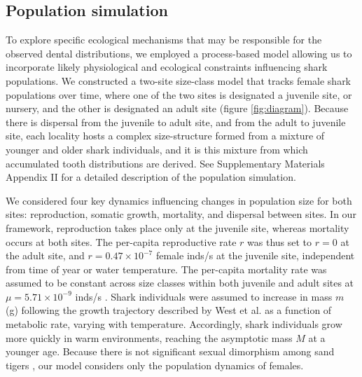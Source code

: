 \documentclass[]{rsos}%
\begin{document}
\subsection{Population simulation}

To explore specific ecological mechanisms that may be responsible for the observed dental distributions, we employed a process-based model allowing us to incorporate likely physiological and ecological constraints influencing shark populations.
We constructed a two-site size-class model that tracks female shark populations over time, where one of the two sites is designated a juvenile site, or nursery, and the other is designated an adult site (figure \ref{fig:diagram}).
Because there is dispersal from the juvenile to adult site, and from the adult to juvenile site, each locality hosts a complex size-structure formed from a mixture of younger and older shark individuals, and it is this mixture from which accumulated tooth distributions are derived.
See Supplementary Materials Appendix II for a detailed description of the population simulation.

We considered four key dynamics influencing changes in population size for both sites: reproduction, somatic growth, mortality, and dispersal between sites.
In our framework, reproduction takes place only at the juvenile site, whereas mortality occurs at both sites.
The per-capita reproductive rate $r$ was thus set to $r=0$ at the adult site, and $r = 0.47 \times 10^{-7}$ female inds/s \cite{cortes1996comparative} at the juvenile site, independent from time of year or water temperature. 
The per-capita mortality rate was assumed to be constant across size classes within both juvenile and adult sites at $\mu = 5.71 \times 10^{-9}$ inds/s \cite{schindler2002sharks}. 
Shark individuals were assumed to increase in mass $m$ (g) following the growth trajectory described by West et al. \cite{West:2001bv} as a function of metabolic rate, varying with temperature.
Accordingly, shark individuals grow more quickly in warm environments, reaching the asymptotic mass $M$ at a younger age.
Because there is not significant sexual dimorphism among sand tigers \cite{Goldman2006}, our model considers only the population dynamics of females.
\end{document}
